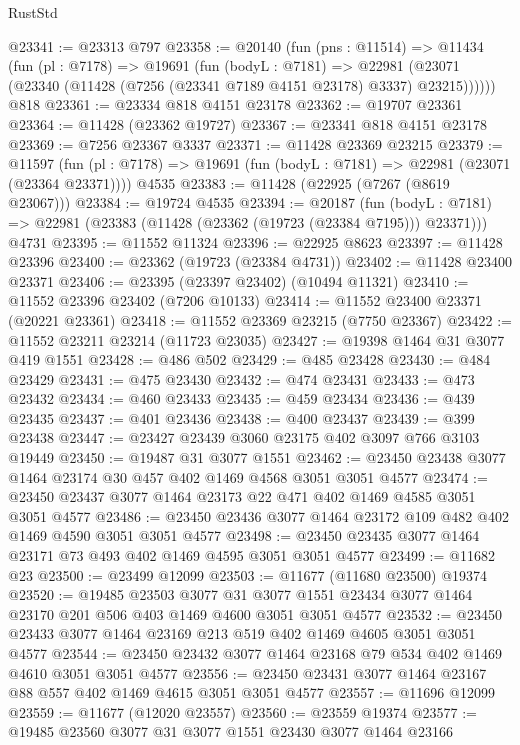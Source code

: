 \begin{lexlean}{RustStd}
\begin{coremodule}
@23341 := @23313 @797
@23358 := @20140
    (fun (pns : @11514) =>
    @11434
      (fun (pl : @7178) =>
      @19691
        (fun (bodyL : @7181) =>
        @22981 (@23071 (@23340 (@11428 (@7256 (@23341 @7189 @4151 @23178) @3337) @23215))))))
    @818
@23361 := @23334 @818 @4151 @23178
@23362 := @19707 @23361
@23364 := @11428 (@23362 @19727)
@23367 := @23341 @818 @4151 @23178
@23369 := @7256 @23367 @3337
@23371 := @11428 @23369 @23215
@23379 := @11597
    (fun (pl : @7178) => @19691 (fun (bodyL : @7181) => @22981 (@23071 (@23364 @23371))))
    @4535
@23383 := @11428 (@22925 (@7267 (@8619 @23067)))
@23384 := @19724 @4535
@23394 := @20187
    (fun (bodyL : @7181) => @22981 (@23383 (@11428 (@23362 (@19723 (@23384 @7195))) @23371)))
    @4731
@23395 := @11552 @11324
@23396 := @22925 @8623
@23397 := @11428 @23396
@23400 := @23362 (@19723 (@23384 @4731))
@23402 := @11428 @23400 @23371
@23406 := @23395 (@23397 @23402) (@10494 @11321)
@23410 := @11552 @23396 @23402 (@7206 @10133)
@23414 := @11552 @23400 @23371 (@20221 @23361)
@23418 := @11552 @23369 @23215 (@7750 @23367)
@23422 := @11552 @23211 @23214 (@11723 @23035)
@23427 := @19398 @1464 @31 @3077 @419 @1551
@23428 := @486 @502
@23429 := @485 @23428
@23430 := @484 @23429
@23431 := @475 @23430
@23432 := @474 @23431
@23433 := @473 @23432
@23434 := @460 @23433
@23435 := @459 @23434
@23436 := @439 @23435
@23437 := @401 @23436
@23438 := @400 @23437
@23439 := @399 @23438
@23447 := @23427 @23439 @3060 @23175 @402 @3097 @766 @3103 @19449
@23450 := @19487 @31 @3077 @1551
@23462 := @23450 @23438 @3077 @1464 @23174 @30 @457 @402 @1469 @4568 @3051 @3051 @4577
@23474 := @23450 @23437 @3077 @1464 @23173 @22 @471 @402 @1469 @4585 @3051 @3051 @4577
@23486 := @23450 @23436 @3077 @1464 @23172 @109 @482 @402 @1469 @4590 @3051 @3051 @4577
@23498 := @23450 @23435 @3077 @1464 @23171 @73 @493 @402 @1469 @4595 @3051 @3051 @4577
@23499 := @11682 @23
@23500 := @23499 @12099
@23503 := @11677 (@11680 @23500) @19374
@23520 := @19485
    @23503
    @3077
    @31
    @3077
    @1551
    @23434
    @3077
    @1464
    @23170
    @201
    @506
    @403
    @1469
    @4600
    @3051
    @3051
    @4577
@23532 := @23450 @23433 @3077 @1464 @23169 @213 @519 @402 @1469 @4605 @3051 @3051 @4577
@23544 := @23450 @23432 @3077 @1464 @23168 @79 @534 @402 @1469 @4610 @3051 @3051 @4577
@23556 := @23450 @23431 @3077 @1464 @23167 @88 @557 @402 @1469 @4615 @3051 @3051 @4577
@23557 := @11696 @12099
@23559 := @11677 (@12020 @23557)
@23560 := @23559 @19374
@23577 := @19485
    @23560
    @3077
    @31
    @3077
    @1551
    @23430
    @3077
    @1464
    @23166

\end{coremodule}
\end{lexlean}
